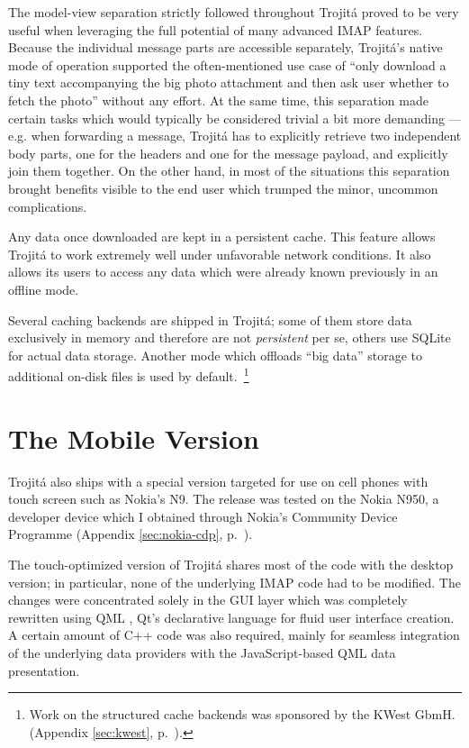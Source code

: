 \documentclass[trojita]{subfiles}
\begin{document}
The model-view separation strictly followed throughout Trojitá proved to be very useful when leveraging the full
potential of many advanced IMAP features.  Because the individual message parts are accessible separately, Trojitá's
native mode of operation supported the often-mentioned use case of ``only download a tiny text accompanying the big
photo attachment and then ask user whether to fetch the photo'' without any effort.  At the same time, this separation
made certain tasks which would typically be considered trivial a bit more demanding --- e.g. when forwarding a message,
Trojitá has to explicitly retrieve two independent body parts, one for the headers and one for the message payload, and
explicitly join them together.  On the other hand, in most of the situations this separation brought benefits visible to
the end user which trumped the minor, uncommon complications.

Any data once downloaded are kept in a persistent cache.  This feature allows Trojitá to work extremely well under
unfavorable network conditions.  It also allows its users to access any data which were already known previously in an
offline mode.

Several caching backends are shipped in Trojitá; some of them store data exclusively in memory and therefore are not
{\em persistent} per se, others use SQLite \cite{sqlite} for actual data storage.  Another mode which offloads ``big
data'' storage to additional on-disk files is used by default.~\footnote{Work on the structured cache backends was
sponsored by the KWest GbmH. (Appendix \ref{sec:kwest}, p.~\pageref{sec:kwest}).}

\section{The Mobile Version}

Trojitá also ships with a special version targeted for use on cell phones with touch screen such as Nokia's N9.  The
release was tested on the Nokia N950, a developer device which I obtained through Nokia's Community Device Programme
(Appendix \ref{sec:nokia-cdp}, p.~\pageref{sec:nokia-cdp}).

The touch-optimized version of Trojitá shares most of the code with the desktop version; in particular, none of the
underlying IMAP code had to be modified.  The changes were concentrated solely in the GUI layer which was completely
rewritten using QML \cite{qml}, Qt's declarative language for fluid user interface creation.  A certain amount of C++
code was also required, mainly for seamless integration of the underlying data providers with the JavaScript-based QML
data presentation.
\end{document}
